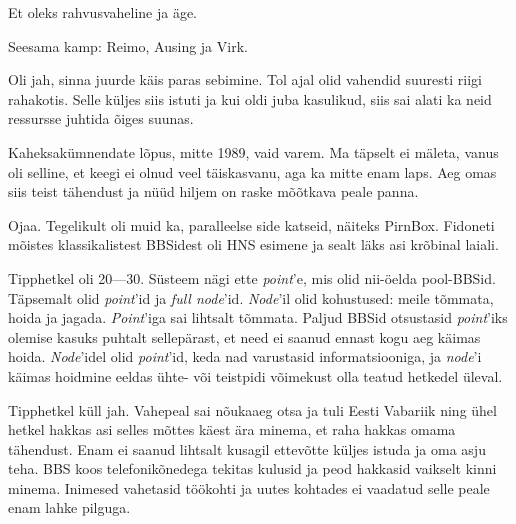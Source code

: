 Et oleks rahvusvaheline ja äge.

Seesama kamp: Reimo, Ausing 
 ja Virk.
 

Oli jah, sinna juurde käis paras sebimine. Tol ajal olid vahendid suuresti riigi rahakotis. Selle küljes siis 
istuti ja kui oldi juba kasulikud, siis sai alati ka neid ressursse juhtida õiges suunas. 


Kaheksakümnendate lõpus, mitte 1989, vaid varem. Ma täpselt ei mäleta, 
vanus oli selline, et keegi ei olnud veel täiskasvanu, aga ka mitte enam laps. Aeg omas siis teist tähendust ja nüüd hiljem on
raske mõõtkava peale panna.


Ojaa. Tegelikult oli muid ka, paralleelse side katseid, näiteks 
PirnBox. Fidoneti mõistes klassikalistest BBSidest oli HNS esimene ja sealt läks 
asi krõbinal laiali.


Tipphetkel oli 20---30. Süsteem nägi ette \emph{point}'e, mis olid nii-öelda pool-BBSid. Täpsemalt olid \emph{point}'id ja \emph{full 
node}'id. \emph{Node}'il olid kohustused: meile tõmmata, hoida ja 
jagada. \emph{Point}'iga sai lihtsalt tõmmata. Paljud 
BBSid otsustasid \emph{point}'iks olemise kasuks puhtalt sellepärast, et need 
ei saanud ennast kogu aeg käimas hoida. \emph{Node}'idel olid \emph{point}'id, keda nad varustasid 
informatsiooniga, ja \emph{node}'i käimas hoidmine eeldas ühte- või teistpidi 
võimekust olla teatud hetkedel üleval.


Tipphetkel küll jah. Vahepeal sai nõukaaeg otsa ja tuli Eesti Vabariik ning ühel 
hetkel hakkas asi selles mõttes käest ära minema, et raha hakkas omama 
tähendust. Enam ei saanud lihtsalt kusagil ettevõtte küljes istuda ja oma
asju teha. BBS koos telefonikõnedega tekitas kulusid ja peod
hakkasid vaikselt kinni minema. Inimesed vahetasid töökohti ja uutes 
kohtades ei vaadatud selle peale enam lahke pilguga.

